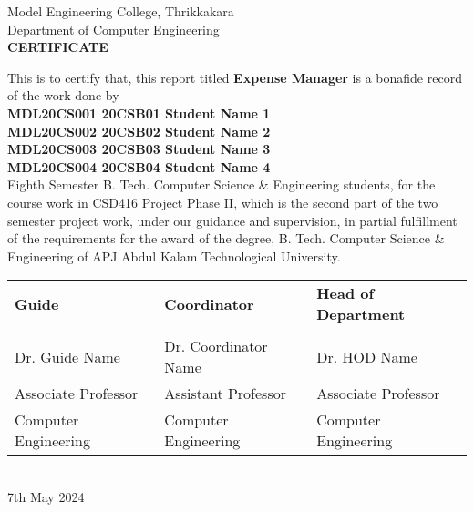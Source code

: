 \thispagestyle{empty}
\begin{center}
{\large Model Engineering College, Thrikkakara}\\[0.5cm]
{\large Department of Computer Engineering}\\[2cm]

{\Large \textbf{CERTIFICATE}}\\[1.5cm]
\end{center}

\noindent This is to certify that, this report titled \textbf{Expense Manager} is a bonafide record of the work done by\\[0.5cm]

\noindent \textbf{MDL20CS001 20CSB01 Student Name 1}\\[0.2cm]
\textbf{MDL20CS002 20CSB02 Student Name 2}\\[0.2cm]
\textbf{MDL20CS003 20CSB03 Student Name 3}\\[0.2cm]
\textbf{MDL20CS004 20CSB04 Student Name 4}\\[0.5cm]

\noindent Eighth Semester B. Tech. Computer Science \& Engineering students, for the course work in CSD416 Project Phase II, which is the second part of the two semester project work, under our guidance and supervision, in partial fulfillment of the requirements for the award of the degree, B. Tech. Computer Science \& Engineering of APJ Abdul Kalam Technological University.\\[2cm]

\begin{tabular}{p{}p{}p{}}
\textbf{Guide} & \textbf{Coordinator} & \textbf{Head of Department} \\
& & \\
Dr. Guide Name & Dr. Coordinator Name & Dr. HOD Name \\
Associate Professor & Assistant Professor & Associate Professor \\
Computer Engineering & Computer Engineering & Computer Engineering \\
\end{tabular}\\[2cm]

\noindent 7th May 2024